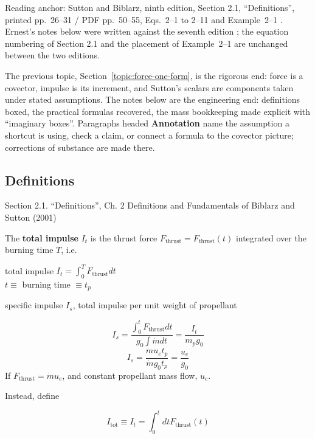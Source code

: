 
Reading anchor: Sutton and Biblarz, ninth edition, Section 2.1,
``Definitions'', printed pp.~26--31 / PDF pp.~50--55, Eqs.~2--1 to 2--11 and
Example~2--1 \cite{sutton}. Ernest's notes below were written against the
seventh edition \cite{GSuttonOBiblarz2001}; the equation numbering of
Section 2.1 and the placement of Example~2--1 are unchanged between the two
editions.

The previous topic, Section~\ref{topic:force-one-form}, is the rigorous end:
force is a covector, impulse is its increment, and Sutton's scalars are
components taken under stated assumptions. The notes below are the
engineering end: definitions boxed, the practical formulas recovered, the
mass bookkeeping made explicit with ``imaginary boxes''. Paragraphs headed
\textbf{Annotation} name the assumption a shortcut is using, check a claim,
or connect a formula to the covector picture; corrections of substance are
made there.

\subsection{Definitions}

Section 2.1. ``Definitions'', Ch. 2 Definitions and Fundamentals of Biblarz
and Sutton (2001) \cite{GSuttonOBiblarz2001}

The \textbf{total impulse} $I_t$ is the thrust force
$F_{\text{thrust}} = F_{\text{thrust}}(t)$ integrated over the burning time
$T$, i.e.

total impulse $I_t = \int_0^T F_{\text{thrust}} dt $ \\
$t\equiv $ burning time $ \equiv t_p$

specific impulse $I_s$, total impulse per unit weight of propellant

\[
I_s = \frac{ \int_0^t F_{\text{thrust}} dt }{ g_0 \int \dot{m} dt }
 = \frac{I_t}{ m_p g_0}
\]
\[
I_s = \frac{ \dot{m} u_e t_p }{ \dot{m} g_0 t_p } = \frac{u_e}{g_0}
\]
If $F_{\text{thrust}} = \dot{m} u_e$, and constant propellant mass flow,
$u_e$.

Instead, define
\begin{definition}
\begin{equation}\label{Eq:TotalImpulseDefinition}
\boxed{ I_{\text{tot}} \equiv I_t = \int_0^t dt F_{\text{thrust}}(t)    }
\end{equation}
\end{definition}

